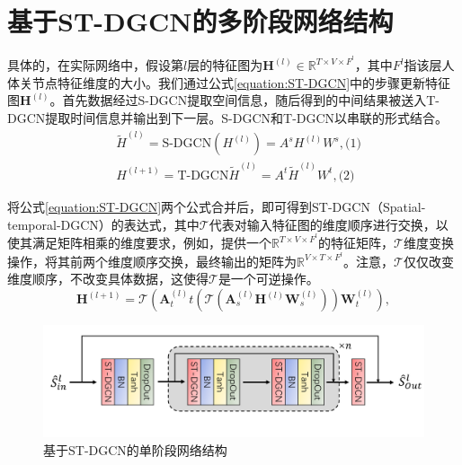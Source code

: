 \section{基于ST-DGCN的多阶段网络结构}
具体的，在实际网络中，假设第$l$层的特征图为$\mathbf{H}^{(l)}\in \mathbb{R}^{T\times V \times F^l}$，其中$F^l$指该层人体关节点特征维度的大小。我们通过公式\ref{equation:ST-DGCN}中的步骤更新特征图$\mathbf{H}^{(l)}$。首先数据经过S-DGCN提取空间信息，随后得到的中间结果被送入T-DGCN提取时间信息并输出到下一层。S-DGCN和T-DGCN以串联的形式结合。
\begin{equation}
    \begin{aligned}
        & {\widetilde{H}^{(l)}} = \text{S-DGCN}(H^{(l)}) = A^s H^{(l)} W^s, \text{(1)}
        \\
        & H^{(l+1)} = \text{T-DGCN}{\widetilde{H}^{(l)}} = A^t {\widetilde{H}^{(l)}} W^t, \text{(2)}
    \end{aligned}
    \label{equation:ST-DGCN}
\end{equation}

将公式\ref{equation:ST-DGCN}两个公式合并后，即可得到ST-DGCN（Spatial-temporal-DGCN）的表达式，其中$\mathcal{T}$代表对输入特征图的维度顺序进行交换，以使其满足矩阵相乘的维度要求，例如，提供一个$\mathbb{R}^{T\times V\times F^{l}}$的特征矩阵，$\mathcal{T}$维度变换操作，将其前两个维度顺序交换，最终输出的矩阵为$\mathbb{R}^{V\times T\times F^{l}}$。注意，$\mathcal{T}$仅仅改变维度顺序，不改变具体数据，这使得$\mathcal{T}$是一个可逆操作。
\begin{equation}
    \mathbf{H}^{(l+1)} = \mathcal{T}\left(
    \mathbf{A}_{t}^{(l)}t
    \left(
    \mathcal{T}
    \left(
    \mathbf{A}_{s}^{(l)}\mathbf{H}^{(l)}\mathbf{W}_s^{(l)}
    \right)
    \right)
    \mathbf{W}_t^{(l)}
    \right),
    \label{equation:ST-DGCN_ensemble}
\end{equation}

\begin{figure}[ht]
    \centering
    \includegraphics[width=1\textwidth]{FigMa/stage_network.png}
    \vspace{-0.3cm}
    \caption{基于ST-DGCN的单阶段网络结构}
    \label{fig:stage_network_structure}
\end{figure}

